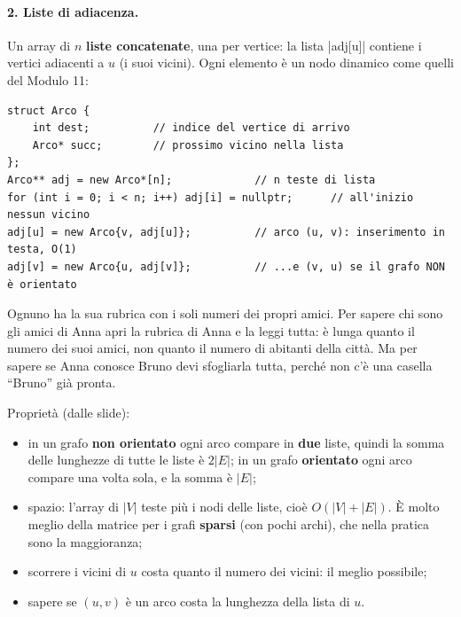 \paragraph{2. Liste di adiacenza.}
Un array di $n$ \textbf{liste concatenate}, una per vertice: la lista \cc|adj[u]| contiene
i vertici adiacenti a $u$ (i suoi vicini). Ogni elemento è un nodo dinamico come quelli
del Modulo 11:
\begin{lstlisting}
struct Arco {
    int dest;          // indice del vertice di arrivo
    Arco* succ;        // prossimo vicino nella lista
};
Arco** adj = new Arco*[n];             // n teste di lista
for (int i = 0; i < n; i++) adj[i] = nullptr;      // all'inizio nessun vicino
adj[u] = new Arco{v, adj[u]};          // arco (u, v): inserimento in testa, O(1)
adj[v] = new Arco{u, adj[v]};          // ...e (v, u) se il grafo NON è orientato
\end{lstlisting}

\begin{analogia}
Ognuno ha la sua rubrica con i soli numeri dei propri amici. Per sapere chi sono gli
amici di Anna apri la rubrica di Anna e la leggi tutta: è lunga quanto il numero dei suoi
amici, non quanto il numero di abitanti della città. Ma per sapere se Anna conosce Bruno
devi sfogliarla tutta, perché non c'è una casella ``Bruno'' già pronta.
\end{analogia}

Proprietà (dalle slide):
\begin{itemize}
  \item in un grafo \textbf{non orientato} ogni arco compare in \textbf{due} liste, quindi
        la somma delle lunghezze di tutte le liste è $2|E|$; in un grafo
        \textbf{orientato} ogni arco compare una volta sola, e la somma è $|E|$;
  \item spazio: l'array di $|V|$ teste più i nodi delle liste, cioè $O(|V| + |E|)$. È
        molto meglio della matrice per i grafi \textbf{sparsi} (con pochi archi), che nella
        pratica sono la maggioranza;
  \item scorrere i vicini di $u$ costa quanto il numero dei vicini: il meglio possibile;
  \item sapere se $(u, v)$ è un arco costa la lunghezza della lista di $u$.
\end{itemize}

